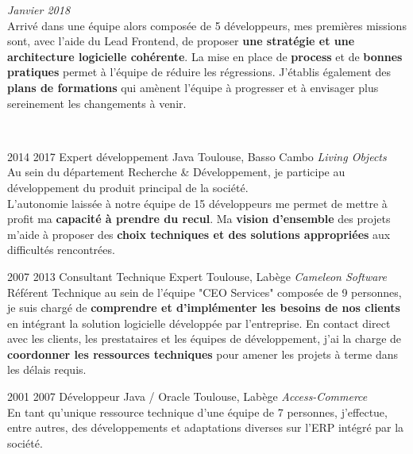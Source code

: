 \documentclass{friggeri-cv} 	%
\begin{document}
\begin{entrylist}
{\begin{description}[leftmargin=0cm]
    \item[\hspace*{-1cm}\bodyfont{|} \normalfont \textbf{\color{orange}Tech \color{headercolor}Lead Backend}] \hfill \textit{Janvier 2018}\\
    Arrivé dans une équipe alors composée de 5 développeurs, mes premières missions sont, avec l’aide du Lead Frontend, de proposer \textbf{une stratégie et une architecture logicielle cohérente}. La mise en place de \textbf{process} et de \textbf{bonnes pratiques} permet à l’équipe de réduire les régressions. J’établis également des \textbf{plans de formations} qui amènent l’équipe à progresser et à envisager plus sereinement les changements à venir.
\end{description}
\
}

\entry
{2014  2017}
{Expert développement Java}
{Toulouse, Basso Cambo}
{\vspace{0.2cm}\emph{Living Objects} \\
Au sein du département Recherche \& Développement, je participe au développement du produit principal de la société.\\
L’autonomie laissée à notre équipe de 15 développeurs me permet de mettre à profit ma \textbf{capacité à prendre du recul}. Ma \textbf{vision d’ensemble} des projets m’aide à proposer des \textbf{choix techniques et des solutions appropriées} aux difficultés rencontrées.
\\}
\end{entrylist}
\begin{entrylist}
\entry
{2007  2013}
{Consultant Technique Expert}
{Toulouse, Labège}
{\vspace{0.2cm}\emph{Cameleon Software} \\
Référent Technique au sein de l’équipe "CEO Services" composée de 9 personnes, je suis chargé de \textbf{comprendre et d’implémenter les besoins de nos clients} en intégrant la solution logicielle développée par l’entreprise. En contact direct avec les clients, les prestataires et les équipes de développement, j’ai la charge de \textbf{coordonner les ressources techniques} pour amener les projets à terme dans les délais requis.
\
}

\entry
{2001 \ding{224} 2007}
{Développeur Java / Oracle}
{Toulouse, Labège}
{\vspace{0.2cm}\emph{Access-Commerce}  \\
En tant qu’unique ressource technique d’une équipe de 7 personnes, j’effectue, entre autres, des développements et adaptations diverses sur l’ERP intégré par la société.
}
\end{entrylist}
\end{document}
